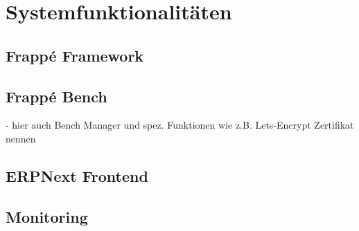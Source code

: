 \chapter{Systemfunktionalitäten}
\label{chap:funkt}

\section{Frappé Framework}

\section{Frappé Bench}
- hier auch Bench Manager und spez. Funktionen wie z.B. Lets-Encrypt Zertifikat nennen

\section{ERPNext Frontend}

\section{Monitoring}